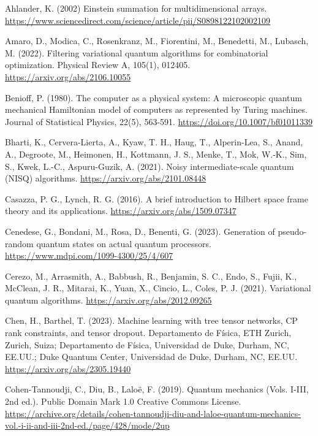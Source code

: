 \begin{thebibliography}{a}

Ahlander, K. (2002) Einstein summation for multidimensional arrays.
\url{https://www.sciencedirect.com/science/article/pii/S0898122102002109}

Amaro, D., Modica, C., Rosenkranz, M., Fiorentini, M., Benedetti, M., Lubasch, M. (2022). Filtering variational quantum algorithms for combinatorial optimization. Physical Review A, 105(1), 012405. \url{https://arxiv.org/abs/2106.10055}

Benioff, P. (1980). The computer as a physical system: A microscopic quantum mechanical Hamiltonian model of computers as represented by Turing machines. Journal of Statistical Physics, 22(5), 563-591. \url{https://doi.org/10.1007/bf01011339}

Bharti, K., Cervera-Lierta, A., Kyaw, T. H., Haug, T., Alperin-Lea, S., Anand, A., Degroote, M., Heimonen, H., Kottmann, J. S., Menke, T., Mok, W.-K., Sim, S., Kwek, L.-C., Aspuru-Guzik, A. (2021). Noisy intermediate-scale quantum (NISQ) algorithms.
\url{https://arxiv.org/abs/2101.08448}

Casazza, P. G., Lynch, R. G. (2016). A brief introduction to Hilbert space frame theory and its applications.
\url{https://arxiv.org/abs/1509.07347}

Cenedese, G., Bondani, M., Rosa, D., Benenti, G. (2023). Generation of pseudo-random quantum states on actual quantum processors.
\url{https://www.mdpi.com/1099-4300/25/4/607}

Cerezo, M., Arrasmith, A., Babbush, R., Benjamin, S. C., Endo, S., Fujii, K., McClean, J. R., Mitarai, K., Yuan, X., Cincio, L., Coles, P. J. (2021). Variational quantum algorithms.
\url{https://arxiv.org/abs/2012.09265}

Chen, H., Barthel, T. (2023). Machine learning with tree tensor networks, CP rank constraints, and tensor dropout. Departamento de Física, ETH Zurich, Zurich, Suiza; Departamento de Física, Universidad de Duke, Durham, NC, EE.UU.; Duke Quantum Center, Universidad de Duke, Durham, NC, EE.UU.
\url{https://arxiv.org/abs/2305.19440}

Cohen-Tannoudji, C., Diu, B., Laloë, F. (2019). Quantum mechanics (Vols. I-III, 2nd ed.). Public Domain Mark 1.0 Creative Commons License.
\url{https://archive.org/details/cohen-tannoudji-diu-and-laloe-quantum-mechanics-vol.-i-ii-and-iii-2nd-ed./page/428/mode/2up}


\end{thebibliography}
